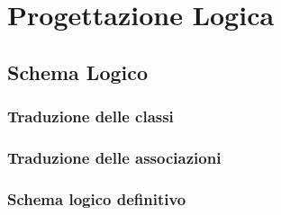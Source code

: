 \chapter{Progettazione Logica}

\section{Schema Logico}

\subsection{Traduzione delle classi}

\subsection{Traduzione delle associazioni}

\subsection{Schema logico definitivo}